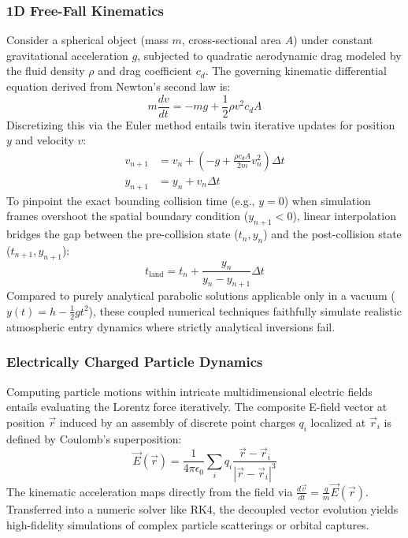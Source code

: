 \documentclass[aps, reprint, twocolumn, superscriptaddress, floatfix]{revtex4-2}
\begin{document}
\subsubsection{1D Free-Fall Kinematics}
Consider a spherical object (mass $m$, cross-sectional area $A$) under constant gravitational acceleration $g$, subjected to quadratic aerodynamic drag modeled by the fluid density $\rho$ and drag coefficient $c_d$. The governing kinematic differential equation derived from Newton's second law is:
\begin{equation}
    m \frac{dv}{dt} = -mg + \frac{1}{2} \rho v^2 c_d A
\end{equation}
Discretizing this via the Euler method entails twin iterative updates for position $y$ and velocity $v$:
\begin{equation}
\begin{aligned}
    v_{n+1} &= v_n + \left( -g + \frac{\rho c_d A}{2m} v_n^2 \right) \Delta t \\
    y_{n+1} &= y_n + v_n \Delta t
\end{aligned}
\end{equation}
To pinpoint the exact bounding collision time (e.g., $y=0$) when simulation frames overshoot the spatial boundary condition ($y_{n+1} < 0$), linear interpolation bridges the gap between the pre-collision state ($t_n, y_n$) and the post-collision state ($t_{n+1}, y_{n+1}$):
\begin{equation}
    t_{\text{land}} = t_n + \frac{y_n}{y_n - y_{n+1}} \Delta t
\end{equation}
Compared to purely analytical parabolic solutions applicable only in a vacuum ($y(t) = h - \frac{1}{2}gt^2$), these coupled numerical techniques faithfully simulate realistic atmospheric entry dynamics where strictly analytical inversions fail.

\subsubsection{Electrically Charged Particle Dynamics}
Computing particle motions within intricate multidimensional electric fields entails evaluating the Lorentz force iteratively. The composite E-field vector at position $\vec{r}$ induced by an assembly of discrete point charges $q_i$ localized at $\vec{r}_i$ is defined by Coulomb's superposition:
\begin{equation}
    \vec{E}(\vec{r}) = \frac{1}{4 \pi \epsilon_0} \sum_i q_i \frac{\vec{r} - \vec{r}_i}{|\vec{r} - \vec{r}_i|^3}
\end{equation}
The kinematic acceleration maps directly from the field via $\frac{d\vec{v}}{dt} = \frac{q}{m} \vec{E}(\vec{r})$. Transferred into a numeric solver like RK4, the decoupled vector evolution yields high-fidelity simulations of complex particle scatterings or orbital captures.
\end{document}
